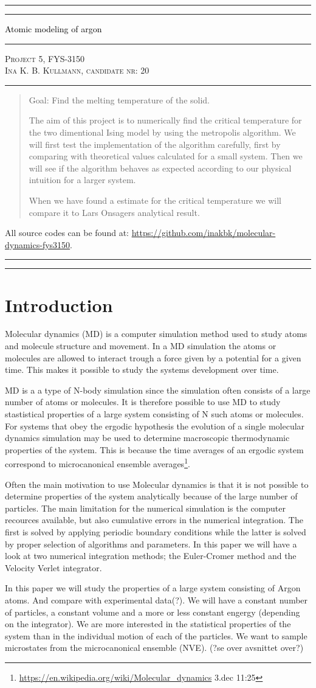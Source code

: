 \documentclass[11pt,a4wide]{article}
\newcommand*{\titleAT}{\begingroup %
\newlength{\drop} %
\drop=0.1\textheight %

\rule{\textwidth}{1pt}\par %
\vspace{2pt}\vspace{-\baselineskip} %
\rule{\textwidth}{0.4pt}\par %

\vspace{0.5\drop} %
\centering %
\textcolor{black}{ %
{\Huge Atomic modeling of argon}\\[0.75\baselineskip] %
} 

\vspace{0.25\drop} %
\rule{0.3\textwidth}{0.4pt}\par %
\vspace{0.25\drop} %

{\Large \textsc{Project 5, FYS-3150\\[0.75\baselineskip] \normalsize{Ina K. B. Kullmann, candidate nr: 20}
}}\par %


\vspace{0.25\drop} %
\rule{0.3\textwidth}{0.4pt}\par %
\vspace{0.25\drop} %

\begin{abstract}
Goal: Find the melting temperature of the solid.

The aim of this project is to numerically find the critical temperature for the two dimentional Ising model by using the metropolis algorithm. We will first test the implementation of the algorithm carefully, first by comparing with theoretical values calculated for a small system. Then we will see if the algorithm behaves as expected according to our physical intuition for a larger system.

When we have found a estimate for the critical temperature we will compare it to Lars Onsagers analytical result.

\end{abstract}
\vspace*{0.25\drop} %

\begin{center}
{ \scriptsize \noindent All source codes can be found at: \url{https://github.com/inakbk/molecular-dynamics-fys3150}. }
\end{center}

\rule{\textwidth}{0.4pt}\par %
\vspace{2pt}\vspace{-\baselineskip} %
\rule{\textwidth}{1pt}\par %

\endgroup}
\begin{document}
\titleAT %


\newpage
\tableofcontents
\newpage

\section{Introduction}

Molecular dynamics (MD) is a computer simulation method used to study atoms and molecule structure and movement. In a MD simulation the atoms or molecules are allowed to interact trough a force given by a potential for a given time. This makes it possible to study the systems development over time. 

MD is a a type of N-body simulation since the simulation often consists of a large number of atoms or molecules. It is therefore possible to use MD to study stastistical properties of a large system consisting of N such atoms or molecules. For systems that obey the ergodic hypothesis the evolution of a single molecular dynamics simulation may be used to determine macroscopic thermodynamic properties of the system. This is because the time averages of an ergodic system correspond to microcanonical ensemble averages\footnote{\url{https://en.wikipedia.org/wiki/Molecular\_dynamics} 3.dec 11:25}.

Often the main motivation to use Molecular dynamics is that it is not possible to determine properties of the system analytically because of the large number of particles. The main limitation for the numerical simulation is the computer recources available, but also cumulative errors in the numerical integration. The first is solved by applying periodic boundary conditions while the latter is solved by proper selection of algorithms and parameters. In this paper we will have a look at two numerical integration methods; the Euler-Cromer method and the Velocity Verlet integrator. 


In this paper we will study the properties of a large system consisting of Argon atoms. And compare with experimental data(?). We will have a constant number of particles, a constant volume and a more or less constant engergy (depending on the integrator). We are more interested in the statistical properties of the system than in the individual motion of each of the particles. We want to sample microstates from the microcanonical ensemble (NVE).
(?se over avsnittet over?)
\end{document}
